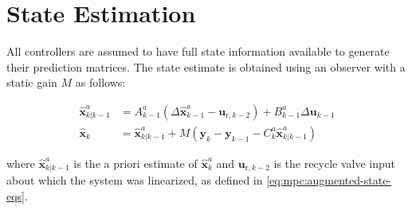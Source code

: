 \section{State Estimation}
\label{sec:mpc:estimation}

All controllers are assumed to have full state information available to generate their prediction matrices.
The state estimate is obtained using an observer with a static gain $M$ as follows:

\begin{equation}
  \begin{split}
    \bm{\hat{x}}_{k|k-1}^a & = A_{k-1}^a \left(\Delta \bm{\hat{x}}_{k-1}^a - \bm{u}_{\text{r},k-2}\right) + B_{k-1}^a \Delta \bm{u}_{k-1}\\
    \bm{\hat{x}}_{k} & = \bm{\hat{x}}_{k|k-1}^a + M \left( \bm{y}_k-\bm{y}_{k-1} - C_k^a \bm{\hat{x}}_{k|k-1}^a \right)
  \end{split}
\end{equation}

\noindent where $\bm{\hat{x}}_{k|k-1}^a$ is the a priori estimate of $\bm{\hat{x}}_k^a$ and $\bm{u}_{\text{r},k-2}$ is the recycle valve input about which the system was linearized, as defined in \eqref{eq:mpc:augmented-state-eqs}.

